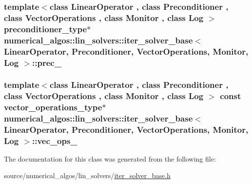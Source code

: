 \hypertarget{classnumerical__algos_1_1lin__solvers_1_1iter__solver__base_ab04244972dffaf21d2c6229f7d1255c6}{
\subsubsection[{prec\-\_\-}]{\setlength{\rightskip}{0pt plus 5cm}template$<$class Linear\-Operator , class Preconditioner , class Vector\-Operations , class Monitor , class Log $>$ {\bf preconditioner\-\_\-type}$\ast$ {\bf numerical\-\_\-algos\-::lin\-\_\-solvers\-::iter\-\_\-solver\-\_\-base}$<$ Linear\-Operator, Preconditioner, Vector\-Operations, Monitor, Log $>$\-::prec\-\_\-\hspace{0.3cm}{\ttfamily [protected]}}}\label{classnumerical__algos_1_1lin__solvers_1_1iter__solver__base_ab04244972dffaf21d2c6229f7d1255c6}
\hypertarget{classnumerical__algos_1_1lin__solvers_1_1iter__solver__base_a405ac817de5aecac284e0d80e0ecdd19}{
\subsubsection[{vec\-\_\-ops\-\_\-}]{\setlength{\rightskip}{0pt plus 5cm}template$<$class Linear\-Operator , class Preconditioner , class Vector\-Operations , class Monitor , class Log $>$ const {\bf vector\-\_\-operations\-\_\-type}$\ast$ {\bf numerical\-\_\-algos\-::lin\-\_\-solvers\-::iter\-\_\-solver\-\_\-base}$<$ Linear\-Operator, Preconditioner, Vector\-Operations, Monitor, Log $>$\-::vec\-\_\-ops\-\_\-\hspace{0.3cm}{\ttfamily [protected]}}}\label{classnumerical__algos_1_1lin__solvers_1_1iter__solver__base_a405ac817de5aecac284e0d80e0ecdd19}


The documentation for this class was generated from the following file\-:\begin{DoxyCompactItemize}
\item 
source/numerical\-\_\-algos/lin\-\_\-solvers/\hyperlink{iter__solver__base_8h}{iter\-\_\-solver\-\_\-base.\-h}\end{DoxyCompactItemize}

